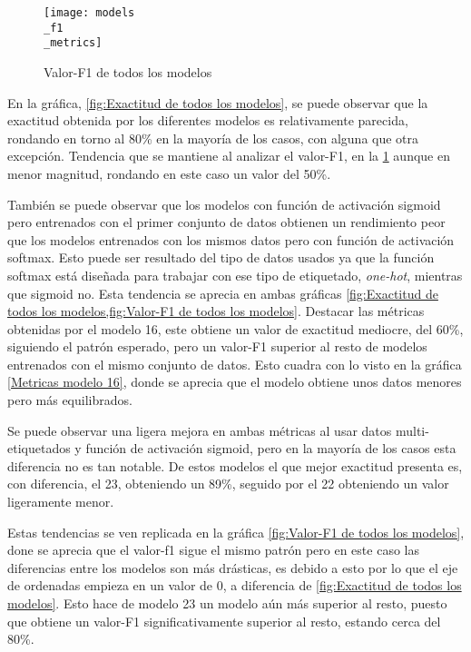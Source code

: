 \begin{figure}[H]
    \centering
    \texttt{[image: models\\\_f1\\\_metrics]}
    \captionsetup{justification=centering}
    \caption{Valor-F1 de todos los modelos}
    \label{fig:Valor-F1 de todos los modelos}
\end{figure}

En la gráfica, \cref{fig:Exactitud de todos los modelos}, se puede observar que la
exactitud obtenida por los diferentes modelos es relativamente parecida,
rondando en torno al 80\% en la mayoría de los casos, con alguna que otra
excepción. Tendencia que se mantiene al analizar el valor-F1, en la
\cref{fig:Valor-F1 de todos los modelos} aunque en menor magnitud, rondando en
este caso un valor del 50\%. 

También se puede observar que los modelos con función de activación sigmoid pero
entrenados con el primer conjunto de datos obtienen un rendimiento peor que los
modelos entrenados con los mismos datos pero con función de activación softmax.
Esto puede ser resultado del tipo de datos usados ya que la función softmax está
diseñada para trabajar con ese tipo de etiquetado, \textit{one-hot}, mientras
que sigmoid no. Esta tendencia se aprecia en ambas gráficas \cref{fig:Exactitud
de todos los modelos,fig:Valor-F1 de todos los modelos}. Destacar las métricas
obtenidas por el modelo 16, este obtiene un valor de exactitud mediocre, del
60\%, siguiendo el patrón esperado, pero un valor-F1 superior al resto de modelos
entrenados con el mismo conjunto de datos. Esto cuadra con lo visto en la
gráfica \cref{Metricas modelo 16}, donde se aprecia que el modelo obtiene unos
datos menores pero más equilibrados.

Se puede observar una ligera mejora en ambas métricas al usar datos
multi-etiquetados y función de activación sigmoid, pero en la mayoría de los
casos esta diferencia no es tan notable. De estos modelos el que mejor exactitud
presenta es, con diferencia, el 23, obteniendo un 89\%, seguido por el 22
obteniendo un valor ligeramente menor.

Estas tendencias se ven replicada en la gráfica \cref{fig:Valor-F1 de todos los
modelos}, done se aprecia que el valor-f1 sigue el mismo patrón pero en este
caso las diferencias entre los modelos son más drásticas, es debido a esto por
lo que el eje de ordenadas empieza en un valor de 0, a diferencia de
\cref{fig:Exactitud de todos los modelos}. Esto hace de modelo 23 un modelo
aún más superior al resto, puesto que obtiene un valor-F1 significativamente
superior al resto, estando cerca del 80\%. 

